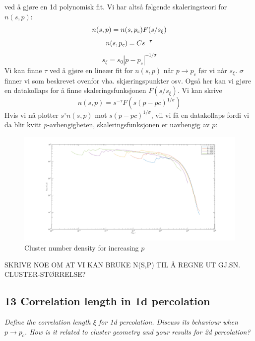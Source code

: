 \documentclass[english, a4paper]{article}
\begin{document}
ved å gjøre en 1d polynomisk fit. Vi har altså følgende skaleringsteori for $n(s,p)$:
\begin{equation}
 n(s,p) = n(s,p_c)F(s/s_\xi) \\
\end{equation}
\begin{equation}
 n(s,p_c) = Cs^{-\tau} \\
\end{equation}
\begin{equation}
 s_\xi = s_0|p-p_c|^{-1/\sigma}
\end{equation}
Vi kan finne $\tau$ ved å gjøre en lineær fit for $n(s,p)$ når $p \to p_c$ før vi når $s_\xi$. 
$\sigma$ finner vi som beskrevet ovenfor vha. skjæringspunkter osv. Også her kan vi gjøre en datakollaps
for å finne skaleringsfunksjonen $F(s/s_\xi)$. Vi kan skrive
\begin{equation}
 n(s,p) = s^{-\tau}F(s(p-pc)^{1/\sigma})
\end{equation}
Hvis vi nå plotter $s^\tau n(s,p)$ mot $s(p-pc)^{1/\sigma}$, vil vi få en datakollaps fordi
vi da blir kvitt $p$-avhengigheten, skaleringsfunksjonen er uavhengig av $p$:
\begin{figure}[H]
  \begin{center}
  \includegraphics[width = 140mm]{../Figures/cndDataCollapse2d.png}
  \caption{Cluster number density for increasing $p$}
  \label{fig:fig9}
  \end{center}
\end{figure}
SKRIVE NOE OM AT VI KAN BRUKE N(S,P) TIL Å REGNE UT GJ.SN. CLUSTER-STØRRELSE?


\subsection{13 Correlation length in 1d percolation}
\textit{Define the correlation length $\xi$ for 1d percolation. Discuss its behaviour when
$p \to p_c$. How is it related to cluster geometry and your results for 2d percolation?}\\
\end{document}
